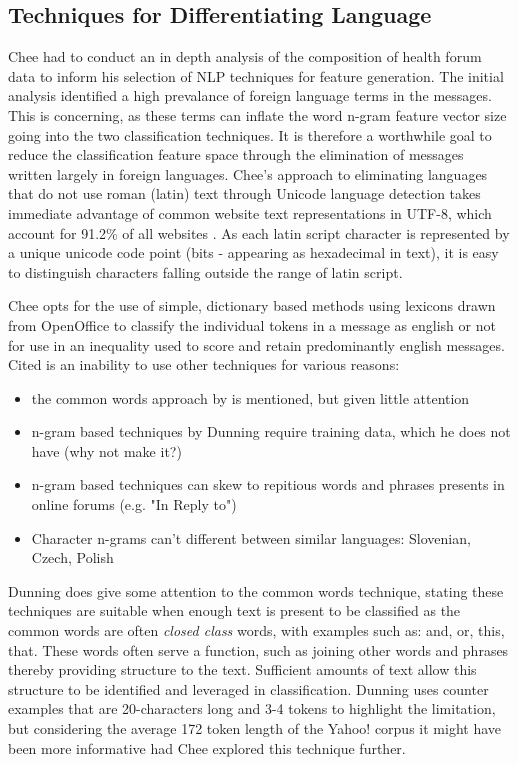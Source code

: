 \documentclass[twoside,11pt]{article}
\begin{document}
\subsection{Techniques for Differentiating Language}
Chee had to conduct an in depth analysis of the composition of health forum data to inform his selection of NLP techniques for feature generation. The initial analysis identified a high prevalance of foreign language terms in the messages. This is concerning, as these terms can inflate the word n-gram feature vector size going into the two classification techniques. It is therefore a worthwhile goal to reduce the classification feature space through the elimination of messages written largely in foreign languages. Chee's approach to eliminating languages that do not use roman (latin) text through Unicode language detection takes immediate advantage of common website text representations in UTF-8, which account for 91.2\% of all websites \citep{UTF-8 article on wikipedia}. As each latin script character is represented by a unique unicode code point (bits - appearing as hexadecimal in text), it is easy to distinguish characters falling outside the range of latin script.

Chee opts for the use of simple, dictionary based methods using lexicons drawn from OpenOffice to classify the individual tokens in a message as english or not for use in an inequality used to score and retain predominantly english messages. Cited is an inability to use other techniques for various reasons:
\begin{itemize}
  \item the common words approach by \citep{Ingle, 1976} is mentioned, but given little attention
  \item n-gram based techniques by Dunning \citep{Dunning} require training data, which he does not have (why not make it?)
  \item n-gram based techniques can skew to repitious words and phrases presents in online forums (e.g. "In Reply to")
  \item Character n-grams can't different between similar languages: Slovenian, Czech, Polish
\end{itemize}

Dunning \citep{Dunning} does give some attention to the common words technique, stating these techniques are suitable when enough text is present to be classified as the common words are often \textit{closed class} words, with examples such as: and, or, this, that. These words often serve a function, such as joining other words and phrases thereby providing structure to the text. Sufficient amounts of text allow this structure to be identified and leveraged in classification. Dunning uses counter examples that are 20-characters long and 3-4 tokens to highlight the limitation, but considering the average 172 token length of the Yahoo! corpus it might have been more informative had Chee explored this technique further.
\end{document}
